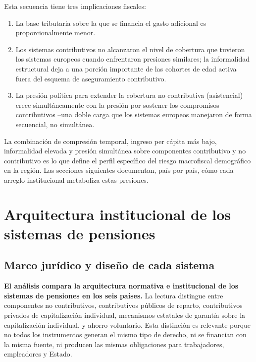 \documentclass[12pt, letterpaper]{article}
\begin{document}
Esta secuencia tiene tres implicaciones fiscales:

\begin{enumerate}
  \item La base tributaria sobre la que se financia el gasto adicional es
        proporcionalmente menor.
  \item Los sistemas contributivos no alcanzaron el nivel de cobertura que tuvieron
        los sistemas europeos cuando enfrentaron presiones similares; la
        informalidad estructural deja a una porción importante de las cohortes de
        edad activa fuera del esquema de aseguramiento contributivo.
  \item La presión política para extender la cobertura no contributiva
        (asistencial) crece simultáneamente con la presión por sostener los
        compromisos contributivos --una doble carga que los sistemas europeos
        manejaron de forma secuencial, no simultánea.
\end{enumerate}

La combinación de compresión temporal, ingreso per cápita más bajo, informalidad
elevada y presión simultánea sobre componentes contributivo y no contributivo es lo
que define el perfil específico del riesgo macrofiscal demográfico en la región.
Las secciones siguientes documentan, país por país, cómo cada arreglo institucional
metaboliza estas presiones.

\newpage

\section{Arquitectura institucional de los sistemas de pensiones}

\subsection{Marco jurídico y diseño de cada sistema}

\textbf{El análisis compara la arquitectura normativa e institucional de los sistemas de pensiones en los seis países.} La lectura distingue entre componentes no contributivos, contributivos públicos de reparto, contributivos privados de capitalización individual, mecanismos estatales de garantía sobre la capitalización individual, y ahorro voluntario. Esta distinción es relevante porque no todos los instrumentos generan el mismo tipo de derecho, ni se financian con la misma fuente, ni producen las mismas obligaciones para trabajadores, empleadores y Estado.
\end{document}
